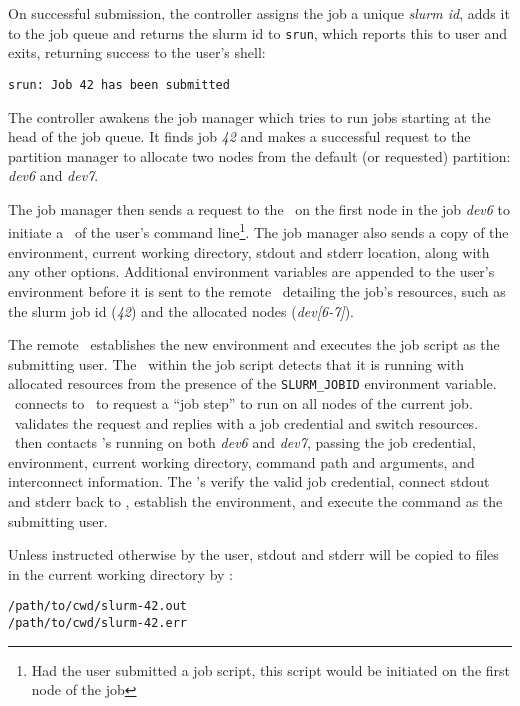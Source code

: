 On successful submission, the controller assigns the job a unique 
{\em slurm id}, adds it to the job queue and returns the 
slurm id to {\tt srun}, which reports this to user and exits, returning
success to the user's shell:

\begin{verbatim}
srun: Job 42 has been submitted
\end{verbatim}

The controller awakens the job manager which tries to run
jobs starting at the head of the job queue.  It finds job {\em 42}
and makes a successful request to the partition manager to allocate 
two nodes from the default (or requested) partition: {\em dev6} and 
{\em dev7}.

The job manager then sends a request to the \slurmd\ on the first node 
in the job {\em dev6} to initiate a \srun\ of the user's
command line\footnote{Had the user submitted a job script, this script would
be initiated on the first node of the job}. The job manager also sends a 
copy of the environment, current working directory, stdout and stderr location,
along with any other options. Additional environment variables are appended
to the user's environment before it is sent to the remote \slurmd\ detailing
the job's resources, such as the slurm job id ({\em 42}) and the
allocated nodes ({\em dev[6-7]}).

The remote \slurmd\ establishes the new environment and executes the
job script as the submitting user. The \srun\ within the job script
detects that it is running with allocated resources from the presence
of the {\tt SLURM\_JOBID} environment variable. \srun\ connects to
\slurmctld\ to request a ``job step'' to run on all nodes of the current
job. \slurmctld\ validates the request and replies with a job credential
and switch resources. \srun\ then contacts \slurmd 's running on both
{\em dev6} and {\em dev7}, passing the job credential, environment,
current working directory, command path and arguments, and interconnect
information. The \slurmd 's verify the valid job credential, connect
stdout and stderr back to \srun , establish the environment, and execute
the command as the submitting user.

Unless instructed otherwise by the user, stdout and stderr will be
copied to files in the current working directory by \srun :

\begin{verbatim}
/path/to/cwd/slurm-42.out
/path/to/cwd/slurm-42.err
\end{verbatim}

